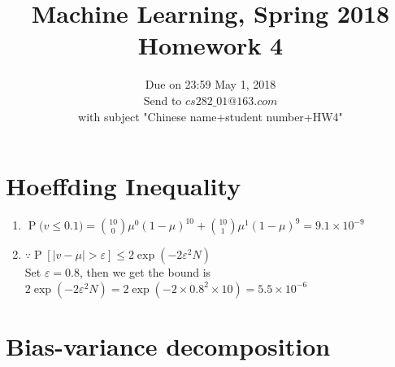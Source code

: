 \documentclass{article}
\begin{document}
\title{Machine Learning, Spring 2018\\Homework 4}
\date{Due on 23:59 May 1, 2018\\Send to $cs282\_01@163.com$ \\with subject "Chinese name+student number+HW4"}
\maketitle




\section{Hoeffding Inequality}

\begin{enumerate}[(1)]
\item ${\displaystyle \operatorname {P} ({v\leq 0.1)={\binom {10}{0}}\mu ^{0}(1-\mu)^{10}} + {\binom {10}{1}}\mu ^{1}(1-\mu)^{9}} = 9.1\times 10^{-9}$
\item $\because {\displaystyle \operatorname {P} [|v-\mu |>\varepsilon ]\leq 2\exp \left(-2\varepsilon ^{2}N\right)}$\\
Set $\varepsilon = 0.8$, then we get the bound is \\
$2\exp \left(-2\varepsilon ^{2}N\right) = 2\exp \left(-2\times 0.8 ^{2}\times 10\right) = 5.5\times 10^{-6}$
\end{enumerate}



\section{Bias-variance decomposition}
\end{document}

